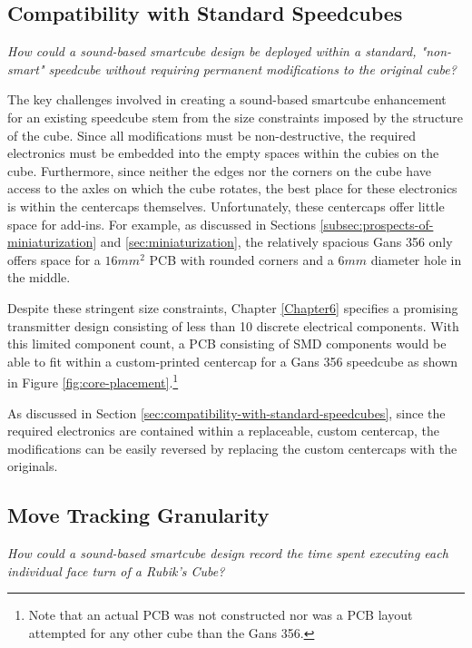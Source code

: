 \subsection{Compatibility with Standard Speedcubes}
\label{subsec:answer-compatibility}

\emph{How could a sound-based smartcube design be deployed within a
standard, "non-smart" speedcube without requiring permanent
modifications to the original cube?}

The key challenges involved in creating a sound-based smartcube
enhancement for an existing speedcube stem from the size constraints
imposed by the structure of the cube. Since all modifications must be
non-destructive, the required electronics must be embedded into the
empty spaces within the cubies on the cube. Furthermore, since neither
the edges nor the corners on the cube have access to the axles on which
the cube rotates, the best place for these electronics is within the
centercaps themselves. Unfortunately, these centercaps offer little
space for add-ins. For example, as discussed in Sections
\ref{subsec:prospects-of-miniaturization} and
\ref{sec:miniaturization}, the relatively spacious Gans 356 only offers
space for a $16mm^2$ PCB with rounded corners and a $6mm$ diameter hole
in the middle.

Despite these stringent size constraints, Chapter \ref{Chapter6}
specifies a promising transmitter design consisting of less than 10
discrete electrical components. With this limited component count, a
PCB consisting of SMD components would be able to fit within a
custom-printed centercap for a Gans 356 speedcube as shown in Figure
\ref{fig:core-placement}.\footnote{Note that an actual PCB was not
constructed nor was a PCB layout attempted for any other cube than the
Gans 356.}

As discussed in Section
\ref{sec:compatibility-with-standard-speedcubes}, since the required
electronics are contained within a replaceable, custom centercap, the
modifications can be easily reversed by replacing the custom centercaps
with the originals.


\subsection{Move Tracking Granularity}
\label{subsec:answer-granularity}

\emph{How could a sound-based smartcube design record the time spent
executing each individual face turn of a Rubik's Cube?}

